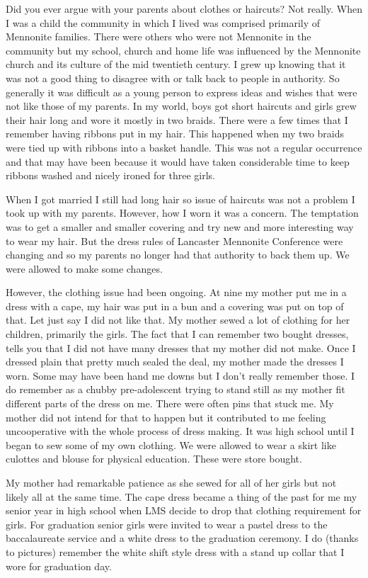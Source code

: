 Did you ever argue with your parents about clothes or haircuts?
Not really.
When I was a child the community in which I lived was comprised primarily of Mennonite families.
There were others who were not Mennonite in the community but my school, church and home life was influenced by the Mennonite church and its culture of the mid twentieth century.
I grew up knowing that it was not a good thing to disagree with or talk back to people in authority.
So generally it was difficult as a young person to express ideas and wishes that were not like those of my parents.
In my world, boys got short haircuts and girls grew their hair long and wore it mostly in two braids.
There were a few times that I remember having ribbons put in my hair.
This happened when my two braids were tied up with ribbons into a basket handle.
This was not a regular occurrence and that may have been because it would have taken considerable time to keep ribbons washed and nicely ironed for three girls.

When I got married I still had long hair so issue of haircuts was not a problem I took up with my parents.
However, how I worn it was a concern.
The temptation was to get a smaller and smaller covering and try new and more interesting way to wear my hair.
But the dress rules of Lancaster Mennonite Conference were changing and so my parents no longer had that authority to back them up.
We were allowed to make some changes.

However, the clothing issue had been ongoing.
At nine my mother put me in a dress with a cape, my hair was put in a bun and a covering was put on top of that.
Let just say I did not like that.
My mother sewed a lot of clothing for her children, primarily the girls.
The fact that I can remember two bought dresses, tells you that I did not have many dresses that my mother did not make.
Once I dressed plain that pretty much sealed the deal, my mother made the dresses I worn.
Some may have been hand me downs but I don't really remember those.
I do remember as a chubby pre-adolescent trying to stand still as my mother fit different parts of the dress on me.
There were often pins that stuck me.
My mother did not intend for that to happen but it contributed to me feeling uncooperative with the whole process of dress making.
It was high school until I began to sew some of my own clothing.
We were allowed to wear a skirt like culottes and blouse for physical education.
These were store bought.

My mother had remarkable patience as she sewed for all of her girls but not likely all at the same time.
The cape dress became a thing of the past for me my senior year in high school when LMS decide to drop that clothing requirement for girls.
For graduation senior girls were invited to wear a pastel dress to the baccalaureate service and a white dress to the graduation ceremony.
I do (thanks to pictures) remember the white shift style dress with a stand up collar that I wore for graduation day.

